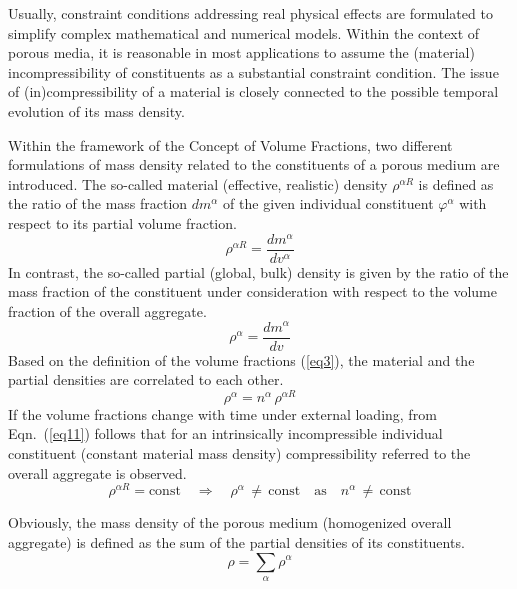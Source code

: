 Usually, constraint conditions addressing real physical effects are formulated to simplify complex mathematical and numerical models. Within the context of porous media, it is reasonable in most applications to assume the (material) incompressibility of constituents as a substantial constraint condition. The issue of (in)compressibility of a material is closely connected to the possible temporal evolution of its mass density.

Within the framework of the Concept of Volume Fractions, two different formulations of mass density related to the constituents of a porous medium are introduced. The so-called material (effective, realistic) density $\rho^{\alpha R}$ is defined as the ratio of the mass fraction $dm^{\alpha}$ of the given individual constituent $\varphi^{\alpha}$ with respect to its partial volume fraction.
\begin{equation}
\rho^{\alpha R}=\frac{dm^{\alpha}}{dv^{\alpha}}
\label{eq9}
\end{equation}
In contrast, the so-called partial (global, bulk) density is given by the ratio of the mass fraction of the constituent under consideration with respect to the volume fraction of the overall aggregate.
\begin{equation}
\rho^{\alpha}=\frac{dm^{\alpha}}{dv}
\label{eq10}
\end{equation}
Based on the definition of the volume fractions (\ref{eq3}), the material and the partial densities are correlated to each other.
\begin{equation}
\rho^{\alpha}=n^{\alpha}\,\rho^{\alpha R}
\label{eq11}
\end{equation}
If the volume fractions change with time under external loading, from Eqn.~(\ref{eq11}) follows that for an intrinsically incompressible individual constituent (constant material mass density) compressibility referred to the overall aggregate is observed.
\begin{equation}
\rho^{\alpha R}=\mbox{const} \quad\Rightarrow\quad
\rho^{\alpha}\,\neq\,\mbox{const}\quad\mbox{as}\quad n^{\alpha}\,\neq\,\mbox{const}
\label{eq12}
\end{equation}

Obviously, the mass density of the porous medium (homogenized overall aggregate) is defined as the sum of the partial densities of its constituents.
\begin{equation}
\rho=\sum\limits_{\alpha}\rho^{\alpha}
\label{eq13}
\end{equation}

